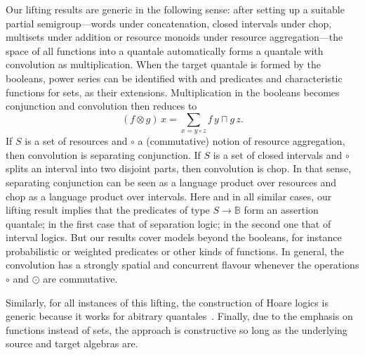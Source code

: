 \documentclass[12pt]{article}
\theoremstyle{definition}
\begin{document}
Our lifting results are generic in the following sense: after setting
up a suitable partial semigroup---words under concatenation, closed
intervals under chop, multisets under addition or resource monoids
under resource aggregation---the space of all functions into a
quantale automatically forms a quantale with convolution as
multiplication.  When the target quantale is formed by the booleans,
power series can be identified with and predicates and characteristic
functions for sets, as their extensions. Multiplication in the
booleans becomes conjunction and convolution then reduces to
\begin{equation*}
  (f\otimes g)\, x = \sum_{x=y\circ z} f\, y \sqcap g\, z.
\end{equation*}
If $S$ is a set of resources and $\circ$ a (commutative) notion of
resource aggregation, then convolution is separating conjunction. If
$S$ is a set of closed intervals and $\circ$ splits an interval into
two disjoint parts, then convolution is chop. In that sense,
separating conjunction can be seen as a language product over
resources and chop as a language product over intervals. Here and in
all similar cases, our lifting result implies that the predicates of
type $S \to \mathbb{B}$ form an assertion quantale; in the first case
that of separation logic; in the second one that of interval
logics. But our results cover models beyond the booleans, for instance
probabilistic or weighted predicates or other kinds of functions. In
general, the convolution has a strongly spatial and concurrent flavour
whenever the operations $\circ$ and $\odot$ are commutative.

Similarly, for all instances of this lifting, the construction of
Hoare logics is generic because it works for abitrary
quantales~\cite{HMSW11}. Finally, due to the emphasis on functions
instead of sets, the approach is constructive so long as the
underlying source and target algebras are.
\end{document}
